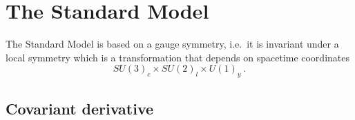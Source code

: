 \appendix

\chapter{The Standard Model}

    The Standard Model is based on a gauge symmetry, i.e.~it is invariant under a local symmetry which is a transformation that depends on spacetime coordinates 
    \begin{equation*}
        SU(3)_c \times SU(2)_l \times U(1)_y ~.
    \end{equation*}

\section{Covariant derivative}

